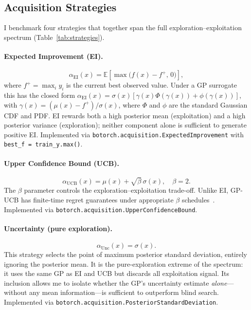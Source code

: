 \subsection{Acquisition Strategies}
\label{sec:strategies}

I benchmark four strategies that together span the full
exploration–exploitation spectrum (Table~\ref{tab:strategies}).

\paragraph{Expected Improvement (EI).}
\[
  \alpha_{\mathrm{EI}}(x)
    = \mathbb{E}\!\left[\max\!\bigl(f(x) - f^+,\, 0\bigr)\right],
\]
where $f^+ = \max_i y_i$ is the current best observed value.
Under a GP surrogate this has the closed form
$\alpha_{\mathrm{EI}}(x) =
  \sigma(x)\!\left[\gamma(x)\Phi(\gamma(x)) + \phi(\gamma(x))\right]$,
with $\gamma(x) = (\mu(x) - f^+)/\sigma(x)$, where $\Phi$ and $\phi$
are the standard Gaussian CDF and PDF.
EI rewards both a high posterior mean (exploitation) and a high
posterior variance (exploration); neither component alone is
sufficient to generate positive EI.
Implemented via \texttt{botorch.acquisition.ExpectedImprovement} with
\texttt{best\_f = train\_y.max()}.

\paragraph{Upper Confidence Bound (UCB).}
\[
  \alpha_{\mathrm{UCB}}(x) = \mu(x) + \sqrt{\beta}\,\sigma(x),
  \quad \beta = 2.
\]
The $\beta$ parameter controls the exploration–exploitation
trade-off.
Unlike EI, GP-UCB has finite-time regret guarantees under appropriate
$\beta$ schedules~\citep{frazier2018tutorial}.
Implemented via \texttt{botorch.acquisition.UpperConfidenceBound}.

\paragraph{Uncertainty (pure exploration).}
\[
  \alpha_{\mathrm{Unc}}(x) = \sigma(x).
\]
This strategy selects the point of maximum posterior standard
deviation, entirely ignoring the posterior mean.
It is the pure-exploration extreme of the spectrum: it uses the same
GP as EI and UCB but discards all exploitation signal.
Its inclusion allows me to isolate whether the GP's uncertainty
estimate \emph{alone}—without any mean information—is sufficient to
outperform blind search.
Implemented via \texttt{botorch.acquisition.PosteriorStandardDeviation}.


